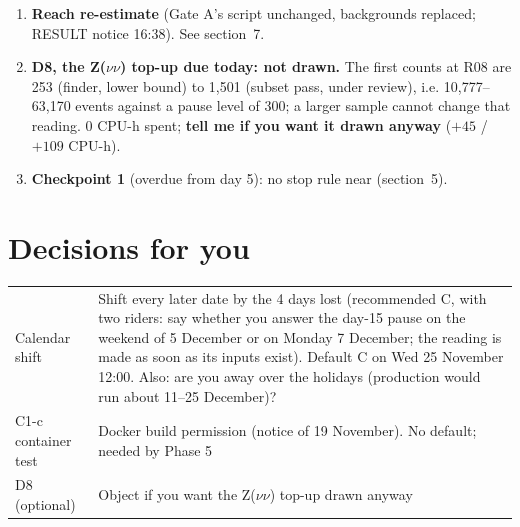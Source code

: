 \documentclass[11pt,a4paper]{article}
\newcommand{\est}{\textsc{est}}
\begin{document}
\begin{enumerate}
      species, the attributed conversion-led term is about $4$--$9\times10^{2}$ events against Gate A's
      $0.7$--$1.0\times10^{4}$ (\est). The planned nuclear-interaction closure test would hold only about 2--9
      events where it was sized for 92--378: it has almost no power and is re-sized in Phase 3 (\est).
\item \textbf{Reach re-estimate} (Gate A's script unchanged, backgrounds replaced; RESULT notice 16:38). See
      section~7.
\item \textbf{D8, the Z($\nu\nu$) top-up due today: not drawn.} The first counts at R08 are 253 (finder, lower
      bound) to 1{,}501 (subset pass, under review), i.e. 10{,}777--63{,}170 events against a pause level of 300;
      a larger sample cannot change that reading. 0 CPU-h spent; \textbf{tell me if you want it drawn anyway}
      ($+45$ / $+109$ CPU-h).
\item \textbf{Checkpoint 1} (overdue from day 5): no stop rule near (section~5).
\end{enumerate}

\section{Decisions for you}
\begin{center}
\begin{tabular}{L{4.0cm}L{10.2cm}}
\toprule
Calendar shift & Shift every later date by the 4 days lost (recommended C, with two riders: say whether you
                 answer the day-15 pause on the weekend of 5 December or on Monday 7 December; the reading is
                 made as soon as its inputs exist). Default C on Wed 25 November 12:00. Also: are you away over
                 the holidays (production would run about 11--25 December)? \\
C1-c container test & Docker build permission (notice of 19 November). No default; needed by Phase 5 \\
D8 (optional) & Object if you want the Z($\nu\nu$) top-up drawn anyway \\
\bottomrule
\end{tabular}
\end{center}
\end{document}
